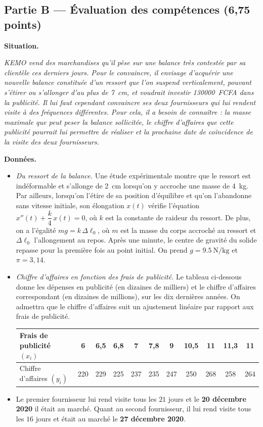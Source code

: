 \subsection*{Partie B — Évaluation des compétences \hfill (6,75 points)}

\noindent\textbf{Situation.}\par\smallskip
\noindent\textit{KEMO vend des marchandises qu'il pèse sur une balance très contestée par sa
clientèle ces derniers jours. Pour le convaincre, il envisage d'acquérir une nouvelle balance
constituée d'un ressort que l'on suspend verticalement, pouvant s'étirer ou s'allonger d'au plus
de \SI{7}{\centi\metre}, et voudrait investir \num{130000}~FCFA dans la publicité. Il lui faut
cependant convaincre ses deux fournisseurs qui lui rendent visite à des fréquences différentes.
Pour cela, il a besoin de connaître : la masse maximale que peut peser la balance sollicitée, le
chiffre d'affaires que cette publicité pourrait lui permettre de réaliser et la prochaine date de
coïncidence de la visite des deux fournisseurs.}

\noindent\textbf{Données.}
\begin{itemize}
\item[\textit{a)}] \textit{Du ressort de la balance.} Une étude expérimentale montre que le ressort
est indéformable et s'allonge de \SI{2}{\centi\metre} lorsqu'on y accroche une masse de
\SI{4}{\kilo\gram}. Par ailleurs, lorsqu'on l'étire de sa position d'équilibre et qu'on l'abandonne
sans vitesse initiale, son élongation $x(t)$ vérifie l'équation
$x''(t)+\dfrac k4\,x(t)=0$, où $k$ est la constante de raideur du ressort. De plus, on a l'égalité
$mg=k\,\Delta\ell_0$, où $m$ est la masse du corps accroché au ressort et $\Delta\ell_0$
l'allongement au repos. Après une minute, le centre de gravité du solide repasse pour la première
fois au point initial. On prend $g=\SI{9,5}{\newton\per\kilo\gram}$ et $\pi=3{,}14$.
\item[\textit{b)}] \textit{Chiffre d'affaires en fonction des frais de publicité.} Le tableau
ci-dessous donne les dépenses en publicité (en dizaines de milliers) et le chiffre d'affaires
correspondant (en dizaines de millions), sur les dix dernières années. On admettra que le chiffre
d'affaires suit un ajustement linéaire par rapport aux frais de publicité.
\par\smallskip
\begin{center}\footnotesize
\begin{tabular}{|l|*{10}{c|}}
\hline
Frais de publicité $(x_i)$ & 6 & 6,5 & 6,8 & 7 & 7,8 & 9 & 10,5 & 11 & 11,3 & 11\\
\hline
Chiffre d'affaires $(y_i)$ & 220 & 229 & 225 & 237 & 235 & 247 & 250 & 268 & 258 & 264\\
\hline
\end{tabular}
\end{center}
\item[\textit{c)}] Le premier fournisseur lui rend visite tous les $21$ jours et le
\textbf{20 décembre 2020} il était au marché. Quant au second fournisseur, il lui rend visite tous
les $16$ jours et était au marché le \textbf{27 décembre 2020}.
\end{itemize}

